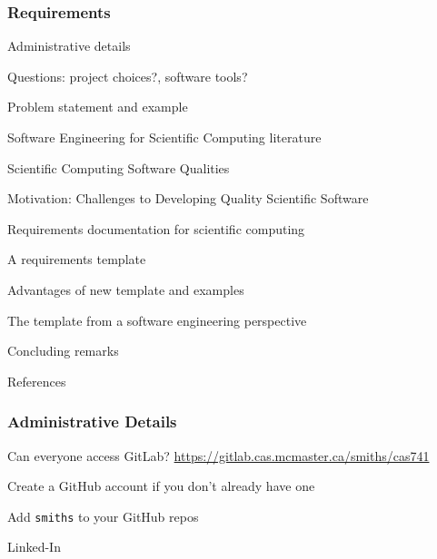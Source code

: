 \documentclass[t,12pt,numbers,fleqn]{beamer}
\begin{document}



\begin{frame}
\frametitle{Requirements}

\bi
\item Administrative details
\item Questions: project choices?, software tools?
\item Problem statement and example
\item Software Engineering for Scientific Computing literature
\item Scientific Computing Software Qualities
\item Motivation: Challenges to Developing Quality Scientific Software
\item Requirements documentation for scientific computing
\item A requirements template
\item Advantages of new template and examples
\item The template from a software engineering perspective
\item Concluding remarks
\item References
\ei
\end{frame}


\begin{frame}
\frametitle{Administrative Details}

\bi
\item Can everyone access GitLab? \href{https://gitlab.cas.mcmaster.ca/smiths/cas741}{https://gitlab.cas.mcmaster.ca/smiths/cas741}
\item Create a GitHub account if you don't already have one
\item Add \texttt{smiths} to your GitHub repos
\item Linked-In
\item {}
\ei

\end{frame}

\end{document}
